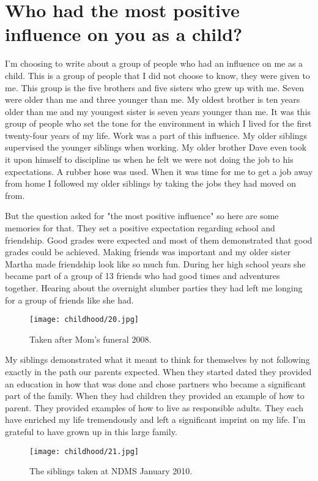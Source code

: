 \section{Who had the most positive influence on you as a child?}
I'm choosing to write about a group of people who had an influence on me as a child.
This is a group of people that I did not choose to know, they were given to me.
This group is the five brothers and five sisters who grew up with me.
Seven were older than me and three younger than me.
My oldest brother is ten years older than me and my youngest sister is seven years younger than me.
It was this group of people who set the tone for the environment in which I lived for the first twenty-four years of my life.
Work was a part of this influence.
My older siblings supervised the younger siblings when working.
My older brother Dave even took it upon himself to discipline us when he felt we were not doing the job to his expectations.
A rubber hose was used.
When it was time for me to get a job away from home I followed my older siblings by taking the jobs they had moved on from.

But the question asked for "the most positive influence" so here are some memories for that.
They set a positive expectation regarding school and friendship.
Good grades were expected and most of them demonstrated that good grades could be achieved.
Making friends was important and my older sister Martha made friendship look like so much fun.
During her high school years she became part of a group of 13 friends who had good times and adventures together.
Hearing about the overnight slumber parties they had left me longing for a group of friends like she had.
\begin{figure}
\centering
\texttt{[image: childhood/20.jpg]}
\caption{
Taken after Mom's funeral 2008.
}
\end{figure}

My siblings demonstrated what it meant to think for themselves by not following exactly in the path our parents expected.
When they started dated they provided an education in how that was done and chose partners who became a significant part of the family.
When they had children they provided an example of how to parent.
They provided examples of how to live as responsible adults.
They each have enriched my life tremendously and left a significant imprint on my life.
I'm grateful to have grown up in this large family.
\begin{figure}
\centering
\texttt{[image: childhood/21.jpg]}
\caption{
The siblings taken at NDMS January 2010.
}
\end{figure}

